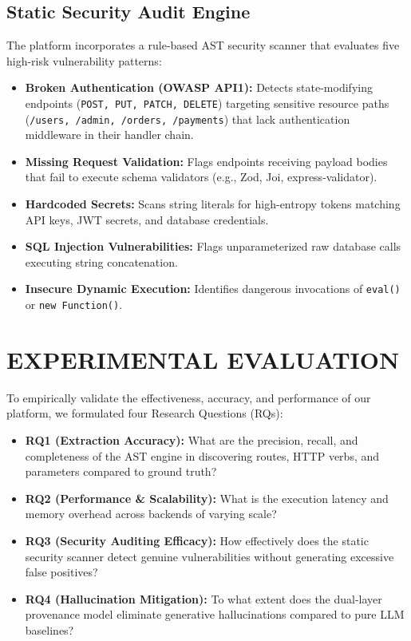 \documentclass[a4paper,10pt]{article}
\begin{document}
\subsection{Static Security Audit Engine}
\noindent
The platform incorporates a rule-based AST security scanner that evaluates five high-risk vulnerability patterns:
\begin{itemize}
  \setlength{\itemsep}{1pt}
  \item \textbf{Broken Authentication (OWASP API1):} Detects state-modifying endpoints (\texttt{POST, PUT, PATCH, DELETE}) targeting sensitive resource paths (\texttt{/users, /admin, /orders, /payments}) that lack authentication middleware in their handler chain.
  \item \textbf{Missing Request Validation:} Flags endpoints receiving payload bodies that fail to execute schema validators (e.g., Zod, Joi, express-validator).
  \item \textbf{Hardcoded Secrets:} Scans string literals for high-entropy tokens matching API keys, JWT secrets, and database credentials.
  \item \textbf{SQL Injection Vulnerabilities:} Flags unparameterized raw database calls executing string concatenation.
  \item \textbf{Insecure Dynamic Execution:} Identifies dangerous invocations of \texttt{eval()} or \texttt{new Function()}.
\end{itemize}

\section{EXPERIMENTAL EVALUATION}
\noindent
To empirically validate the effectiveness, accuracy, and performance of our platform, we formulated four Research Questions (RQs):
\begin{itemize}
  \setlength{\itemsep}{1pt}
  \item \textbf{RQ1 (Extraction Accuracy):} What are the precision, recall, and completeness of the AST engine in discovering routes, HTTP verbs, and parameters compared to ground truth?
  \item \textbf{RQ2 (Performance \& Scalability):} What is the execution latency and memory overhead across backends of varying scale?
  \item \textbf{RQ3 (Security Auditing Efficacy):} How effectively does the static security scanner detect genuine vulnerabilities without generating excessive false positives?
  \item \textbf{RQ4 (Hallucination Mitigation):} To what extent does the dual-layer provenance model eliminate generative hallucinations compared to pure LLM baselines?
\end{itemize}
\end{document}
